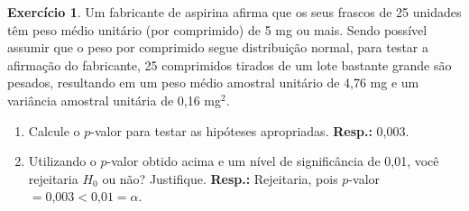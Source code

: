 \documentclass[]{article}
\theoremstyle{definition}
\newtheorem{ex}{Exercício}
\begin{document}
\begin{ex}
Um fabricante de aspirina afirma que os seus frascos de 25 unidades têm peso médio unitário (por comprimido) de 5 mg ou mais. Sendo possível assumir que o peso por comprimido segue distribuição normal, para testar a afirmação do fabricante, 25 comprimidos tirados de um lote bastante grande são pesados, resultando em um peso médio amostral unitário de 4,76 mg e um variância amostral unitária de 0,16 mg$^2$.
\begin{enumerate}
	\item Calcule o $p$-valor para testar as hipóteses apropriadas. \textbf{Resp.:} 0,003.
	\item Utilizando o $p$-valor obtido acima e um nível de significância de 0,01, você rejeitaria $H_0$ ou não? Justifique. \textbf{Resp.:} Rejeitaria, pois $p$-valor $= 0\text{,}003 < 0\text{,}01 = \alpha$.
\end{enumerate}
\end{ex}
\end{document}
